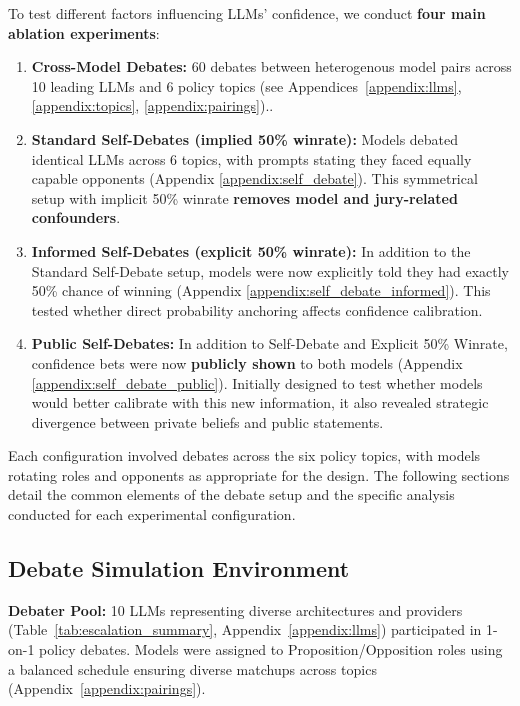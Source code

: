 \documentclass{article}
\begin{document}
To test different factors influencing LLMs' confidence, we conduct \textbf{four main ablation experiments}:

\begin{enumerate}    
    \item \textbf{Cross-Model Debates:} 60 debates between heterogenous model pairs across 10 leading LLMs and 6 policy topics (see Appendices~\ref{appendix:llms}, \ref{appendix:topics}, \ref{appendix:pairings})..

    \item \textbf{Standard Self-Debates (implied 50\% winrate):} Models debated identical LLMs across 6 topics, with prompts stating they faced equally capable opponents (Appendix \ref{appendix:self_debate}). This symmetrical setup with implicit 50\% winrate \textbf{removes model and jury-related confounders}.

    \item \textbf{Informed Self-Debates (explicit 50\% winrate):} In addition to the Standard Self-Debate setup, models were now explicitly told they had exactly 50\% chance of winning (Appendix \ref{appendix:self_debate_informed}). This tested whether direct probability anchoring affects confidence calibration.

    \item \textbf{Public Self-Debates:} In addition to Self-Debate and Explicit 50\% Winrate, confidence bets were now \textbf{publicly shown} to both models (Appendix \ref{appendix:self_debate_public}). Initially designed to test whether models would better calibrate with this new information, it also revealed strategic divergence between private beliefs and public statements.
\end{enumerate}
Each configuration involved debates across the six policy topics, with models rotating roles and opponents as appropriate for the design. The following sections detail the common elements of the debate setup and the specific analysis conducted for each experimental configuration.

\subsection{Debate Simulation Environment}
\label{subsec:debate_env}

\textbf{Debater Pool:} 10 LLMs representing diverse architectures and providers (Table~\ref{tab:escalation_summary}, Appendix~\ref{appendix:llms}) participated in 1-on-1 policy debates. Models were assigned to Proposition/Opposition roles using a balanced schedule ensuring diverse matchups across topics (Appendix~\ref{appendix:pairings}).
\end{document}
